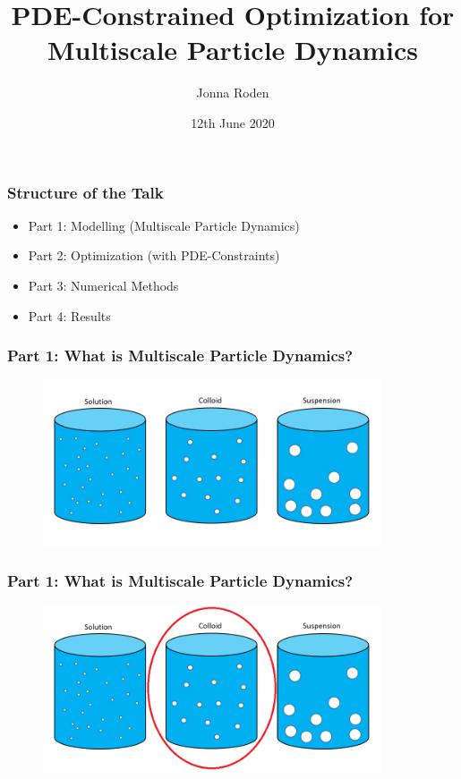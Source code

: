 \documentclass[aspectratio=169,xcolor=dvipsnames]{beamer}
\begin{document}
\title[]{PDE-Constrained Optimization for Multiscale Particle Dynamics}
\author[Jonna Roden]{Jonna Roden}
\date{12th June 2020}

\begin{frame}
\titlepage
\end{frame}
 
 
\begin{frame}
	\frametitle{Structure of the Talk}
	 
	 \begin{itemize}
	 	\item Part 1: Modelling (Multiscale Particle Dynamics)
	 	\item Part 2: Optimization (with PDE-Constraints)
	 	\item Part 3: Numerical Methods 
	 	\item Part 4: Results
	 \end{itemize}
\end{frame}
\begin{frame}
	\frametitle{Part 1: What is Multiscale Particle Dynamics?}
	
	\begin{figure}
		\includegraphics[width=10cm]{Particles1.jpg}
	\end{figure}
	
\end{frame}

\begin{frame}
	\frametitle{Part 1: What is Multiscale Particle Dynamics?}
	
	\begin{figure}
		\includegraphics[width=10cm]{Particles2.png}
	\end{figure}

\end{frame}
\end{document}
